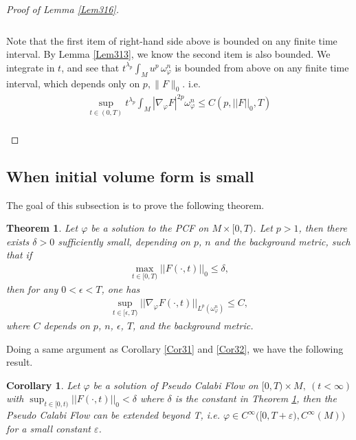 \documentclass[11pt]{amsart}
\newtheorem{thm}{Theorem}[section]
\newtheorem{cor}[lem]{Corollary}
\numberwithin{equation}{section}
\newcommand \eps{\varepsilon}
\begin{document}
\begin{proof}[Proof of Lemma \ref{Lem316}]
\begin{align}
\end{align}\\
Note that the first item of right-hand side above is bounded on any finite time interval. By Lemma \ref{Lem313}, we know the second item is also bounded. We integrate in $t$, and see that $ t^{\lambda_p} \int_M u^p \, \omega_{\varphi}^n $ is bounded from above on any finite time interval, which depends only on $ p, \|F\|_0$. i.e. 
\begin{align}
	\sup_{t\in (0,T)} t^{\lambda_p} \int_M |\nabla_\varphi F|^{2p}\omega_\varphi^n \le  C(p,||F||_0,T)
\end{align}\\
\end{proof}



\subsection{When initial volume form is small }

The goal of this subsection is to prove the following theorem. 

\begin{thm}\label{MT32}
	Let $\varphi$ be a solution to the PCF on $M\times [0,T)$.  Let $p>1$,  then there exists $\delta>0$ sufficiently small,  depending on $p$,  $n$ and the background metric,  such that if 
		\begin{align}
			\max_{t\in [0,T)}||F(\cdot,t)||_0\le \delta,
		\end{align}
	then for any $0<\epsilon <T$,  one has 
		\begin{align}
			\sup_{t\in [\epsilon ,T)}||\nabla_{\varphi} F(\cdot,t)||_{L^p(\omega_{\varphi}^n)}\le C,
		\end{align}
	where $C$ depends on $p$,  $n$,  $\epsilon$,  $T$,  and the background metric.\\
\end{thm}

\noindent
Doing a same argument as Corollary \ref{Cor31} and \ref{Cor32}, we have the following result. 

\begin{cor}\label{Cor33}
	Let $\varphi$ be a solution of Pseudo Calabi Flow on $[0,T)\times M,\ (t<\infty)$ with $\sup_{t\in [0,t)}||F(\cdot,t)||_0<\delta$ where $\delta$ is the constant in Theorem \ref{MT32}, then the Pseudo Calabi Flow can be extended beyond T, i.e. $\varphi\in C^\infty \big([0,T+\eps) ,C^{\infty}(M)\big)$ for a small constant $\eps$. \\
\end{cor}
\end{document}
